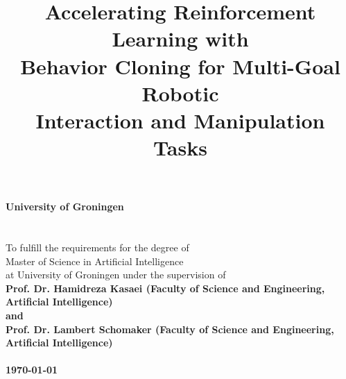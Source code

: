 \documentclass[a4paper,12pt,twoside]{article}
\begin{document}
\pagestyle{body}


\title{
    \vspace{5cm}
        {\bf
        {\Huge Accelerating Reinforcement Learning with\\
        \vspace{2mm}Behavior Cloning for Multi-Goal Robotic\\
        \vspace{4mm}Interaction and Manipulation Tasks}}\\
        \vspace{10cm}{\LARGE Hari Vidharth}
}
\date{}

\maketitle
\thispagestyle{titlepage}


\newpage

\thispagestyle{titlepage}

\vspace*{4cm}

\begin{center}
    {\bf{\large University of Groningen}}\\

    \\

    \vspace{1cm}{\bf Master's Thesis}\\

    \vspace{1cm}To fulfill the requirements for the degree of\\
    Master of Science in Artificial Intelligence\\
    at University of Groningen under the supervision of\\

    \bf{Prof. Dr. Hamidreza Kasaei (Faculty of Science and Engineering, Artificial Intelligence)}\\
    and\\
    \bf{Prof. Dr. Lambert Schomaker (Faculty of Science and Engineering, Artificial Intelligence)}\\

    \\

    \vspace{7cm}\today
\end{center}
\end{document}
